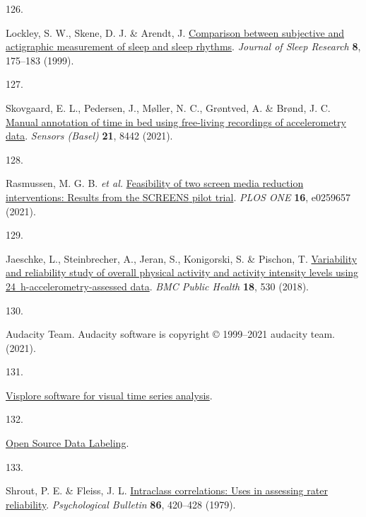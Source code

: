 \documentclass[
  10pt,
]{scrbook}
\newlength{\cslhangindent}
\newlength{\csllabelwidth}
\newlength{\cslentryspacingunit} %
\newenvironment{CSLReferences}[2] %
 {%
  \setlength{\parindent}{0pt}
  \ifodd #1
  \let\oldpar\par
  \def\par{\hangindent=\cslhangindent\oldpar}
  \fi
  \setlength{\parskip}{#2\cslentryspacingunit}
 }%
 {}
\newcommand{\CSLLeftMargin}[1]{\parbox[t]{\csllabelwidth}{#1}}
\newcommand{\CSLRightInline}[1]{\parbox[t]{\linewidth - \csllabelwidth}{#1}\break}
\let\originaltextbf\textbf
\renewcommand{\textbf}[1]{\textcolor{color1}{\textsf{\originaltextbf{#1}}}}
\begin{document}
\begin{CSLReferences}{0}{0}
\leavevmode{}%
\CSLLeftMargin{126. }%
\CSLRightInline{Lockley, S. W., Skene, D. J. \& Arendt, J.
\href{https://doi.org/10.1046/j.1365-2869.1999.00155.x}{Comparison
between subjective and actigraphic measurement of sleep and sleep
rhythms}. \emph{Journal of Sleep Research} \textbf{8}, 175--183 (1999).}

\leavevmode{}%
\CSLLeftMargin{127. }%
\CSLRightInline{Skovgaard, E. L., Pedersen, J., Møller, N. C., Grøntved,
A. \& Brønd, J. C. \href{https://doi.org/10.3390/s21248442}{Manual
annotation of time in bed using free-living recordings of accelerometry
data}. \emph{Sensors (Basel)} \textbf{21}, 8442 (2021).}

\leavevmode{}%
\CSLLeftMargin{128. }%
\CSLRightInline{Rasmussen, M. G. B. \emph{et al.}
\href{https://doi.org/10.1371/journal.pone.0259657}{Feasibility of two
screen media reduction interventions: Results from the {SCREENS} pilot
trial}. \emph{{PLOS} {ONE}} \textbf{16}, e0259657 (2021).}

\leavevmode{}%
\CSLLeftMargin{129. }%
\CSLRightInline{Jaeschke, L., Steinbrecher, A., Jeran, S., Konigorski,
S. \& Pischon, T.
\href{https://doi.org/10.1186/s12889-018-5415-8}{Variability and
reliability study of overall physical activity and activity intensity
levels using 24~h-accelerometry-assessed data}. \emph{{BMC} Public
Health} \textbf{18}, 530 (2018).}

\leavevmode{}%
\CSLLeftMargin{130. }%
\CSLRightInline{Audacity Team. Audacity\textregistered{} software is
copyright © 1999--2021 audacity team. (2021).}

\leavevmode{}%
\CSLLeftMargin{131. }%
\CSLRightInline{\href{https://visplore.com/home-11-2022/}{Visplore
{\textendash} software for visual time series analysis}.}

\leavevmode{}%
\CSLLeftMargin{132. }%
\CSLRightInline{\href{https://labelstud.io/}{Open Source Data
Labeling}.}

\leavevmode{}%
\CSLLeftMargin{133. }%
\CSLRightInline{Shrout, P. E. \& Fleiss, J. L.
\href{https://doi.org/10.1037/0033-2909.86.2.420}{Intraclass
correlations: Uses in assessing rater reliability}. \emph{Psychological
Bulletin} \textbf{86}, 420--428 (1979).}


\end{CSLReferences}
\end{document}

